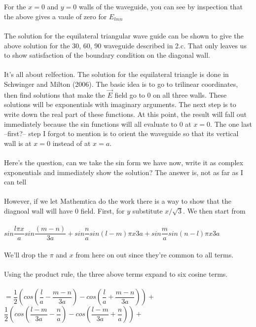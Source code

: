 \documentclass[prb,preprint]
{revtex4-1}
\begin{document}
\\
\\
For the $x = 0$ and $y = 0$ walls of the waveguide, you can see by inspection that the above gives a vaule of zero for $E_{lmn}$
\\
\\
The solution for the equilateral triangular wave guide can be shown to give the above solution for the 30, 60, 90 waveguide described in 2.c.  That only leaves us to show satisfaction of the boundary condition on the diagonal wall.
\\
\\
It's all about relfection.  The solution for the equilateral triangle is done in Schwinger and Milton (2006).  The basic idea is to go to trilinear coordinates, then find solutions that make the $\vec{E}$ field go to 0 on all three walls.  These solutions will be exponentials with imaginary arguments.  The next step is to write down the real part of these functions.  At this point, the result will fall out immediately because the sin functions will all evaluate to 0 at $x = 0$.  The one last --first?-- step I forgot to mention is to orient the waveguide so that its vertical wall is at $x = 0$ instead of at $x = a$.
\\
\\
Here's the question, can we take the sin form we have now, write it as complex exponentials and immediately show the solution?  The answer is, not as far as I can tell
\\
\\
However, if we let Mathemtica do the work there is a way to show that the diagnoal wall will have 0 field.  First, for $y$ substitute $x/\sqrt{3}$.  We then start from 
\\
\\
$sin\dfrac{l\pi x}{a} sin\dfrac{\left(m-n\right)}{3a} + sin\dfrac{n}{a} sin{\left(l-m\right)\pi x}{3a} + sin\dfrac{m}{a} sin{\left(n-l\right)\pi x}{3a}$
\\
\\
We'll drop the $\pi$ and $x$ from here on out since they're common to all terms.  
\\
\\
\newpage
Using the product rule, the three above terms expand to six cosine terms.
\\
\\
$= \dfrac{1}{2}\left(cos\left(\dfrac{l}{a}-\dfrac{m-n}{3a}\right) - cos\left(\dfrac{l}{a}+\dfrac{m-n}{3a}\right)\right) + $
\\
$\dfrac{1}{2}\left(cos\left(\dfrac{l-m}{3a}-\dfrac{n}{a}\right) - cos\left(\dfrac{l-m}{3a}+\dfrac{n}{a}\right)\right) + $
\end{document}

